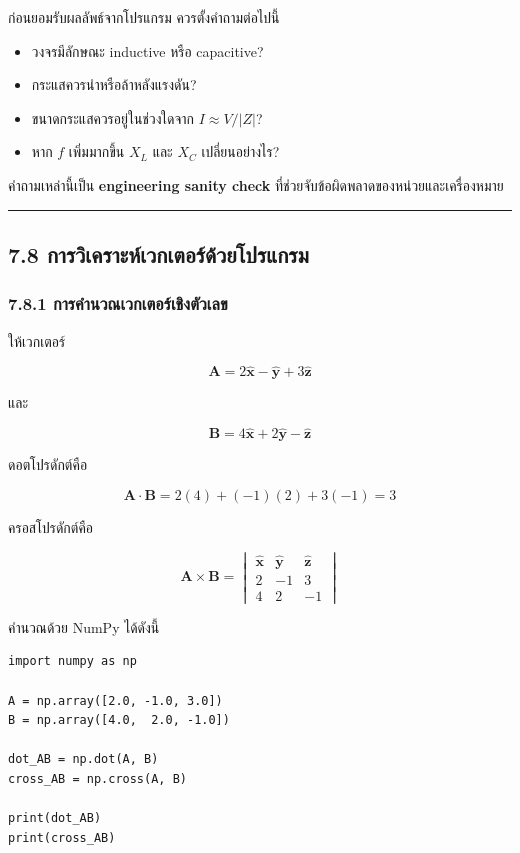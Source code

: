 ก่อนยอมรับผลลัพธ์จากโปรแกรม ควรตั้งคำถามต่อไปนี้

\begin{itemize}
    \item วงจรมีลักษณะ inductive หรือ capacitive?
    \item กระแสควรนำหรือล้าหลังแรงดัน?
    \item ขนาดกระแสควรอยู่ในช่วงใดจาก $I\approx V/|Z|$?
    \item หาก $f$ เพิ่มมากขึ้น $X_L$ และ $X_C$ เปลี่ยนอย่างไร?
\end{itemize}

คำถามเหล่านี้เป็น \textbf{engineering sanity check} ที่ช่วยจับข้อผิดพลาดของหน่วยและเครื่องหมาย

\par\noindent\rule{\textwidth}{0.4pt}\par

\subsection{7.8 การวิเคราะห์เวกเตอร์ด้วยโปรแกรม}

\subsubsection{7.8.1 การคำนวณเวกเตอร์เชิงตัวเลข}

ให้เวกเตอร์

\[
\mathbf{A}=2\hat{\mathbf{x}}-\hat{\mathbf{y}}+3\hat{\mathbf{z}}
\]

และ

\[
\mathbf{B}=4\hat{\mathbf{x}}+2\hat{\mathbf{y}}-\hat{\mathbf{z}}
\]

ดอตโปรดักต์คือ

\[
\mathbf{A}\cdot\mathbf{B}=2(4)+(-1)(2)+3(-1)=3
\]

ครอสโปรดักต์คือ

\[
\mathbf{A}\times\mathbf{B}
=\begin{vmatrix}
\hat{\mathbf{x}} & \hat{\mathbf{y}} & \hat{\mathbf{z}}\\
2&-1&3\\
4&2&-1
\end{vmatrix}
\]

คำนวณด้วย NumPy ได้ดังนี้

\begin{verbatim}
import numpy as np

A = np.array([2.0, -1.0, 3.0])
B = np.array([4.0,  2.0, -1.0])

dot_AB = np.dot(A, B)
cross_AB = np.cross(A, B)

print(dot_AB)
print(cross_AB)
\end{verbatim}

